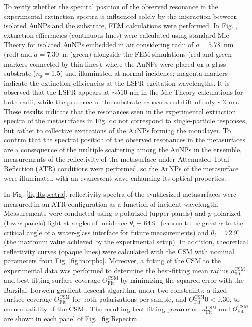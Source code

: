 To verify whether the spectral position of the observed resonance in the experimental extinction spectra is influenced solely by the interaction between isolated AuNPs and the substrate, FEM calculations were performed. In Fig. , extinction efficiencies (continuous lines) were calculated using standard Mie Theory for isolated AuNPs embedded in air considering radii of $a=5.78$~nm (red) and $a=7.30$~m (green) alongside the  FEM simulations (red and green markers connected by thin lines), where the AuNPs were placed on a glass substrate ($n_\text{s}=1.5$) and illuminated at normal incidence; magenta markers indicate the extinction efficiencies at the LSPR excitation wavelengths. It is observed that the LSPR appears at $\sim 510$ nm in the Mie Theory calculations for both radii, while the presence of the substrate causes a redshift of only $\sim 3$ nm. These results indicate that the resonances seen in the experimental extinction spectra of the metasurfaces in Fig.  do not correspond to single-particle responses, but rather to collective excitations of the AuNPs forming the monolayer. To confirm that the spectral position of the observed resonances in the metasurfaces are a consequence of the multiple scattering among the AuNPs in the ensemble, measurements of the reflectivity of the metasurface under Attenuated Total Reflection (ATR) conditions were performed, so the AuNPs of the metasurface were illuminated with an evanescent wave enhancing its optical properties.

In Fig. \ref{fig:Rspectra}, reflectivity spectra of the synthesized metasurfaces were measured in an ATR configuration as a function of incident wavelength. Measurements were conducted using $s$ polarized (upper panels) and $p$ polarized (lower panels) light at angles of incidence $\theta_i=64.9^\circ$ (chosen to be greater to the critical angle of a water-glass interface for future measurements) and $\theta_i=72.9^\circ$ (the maximum value achieved by the experimental setup). In addition, theoretical reflectivity curves (opaque lines) were calculated with the CSM with nominal parameters from Fig. \ref{fig:morpho}. Moreover, a fitting of the CSM to the experimental data was performed to determine the best-fitting mean radius $a_\text{Fit}^\text{CSM}$ and best-fitting surface coverage $\Theta_\text{Fit}^\text{CSM}$ by minimizing the squared error with the Barzilai–Borwein gradient descent algorithm \cite{barzilai_two-point_1988} under two constraints: a fixed surface coverage $\Theta_\text{Fit}^\text{CSM}$ for both polarizations per sample, and $\Theta_\text{Fit}^\text{CSM}0<0.30$, to ensure validity of the CSM \cite{loiko_monolayers_1998}. The resulting best-fitting parameters $a_\text{Fit}^\text{CSM}$ and  $\Theta_\text{Fit}^\text{CSM}$ are shown in each panel of Fig.~\ref{fig:Rspectra}.

